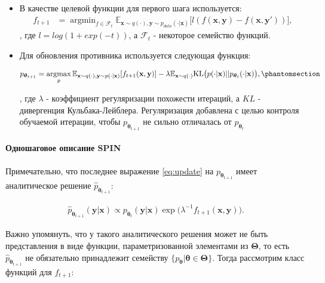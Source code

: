 \documentclass[12pt, twoside]{article}
\newcommand{\bx}{\mathbf{x}}
\newcommand{\by}{\mathbf{y}}
\newcommand{\btheta}{\boldsymbol{\theta}}
\newcommand{\bTheta}{\boldsymbol{\Theta}}
\newcommand{\cF}{\mathcal{F}}
\newcommand{\EE}{\mathbb{E}}
\newcommand{\argmax}{\mathop{\mathrm{argmax}}}
\newcommand{\argmin}{\mathop{\mathrm{argmin}}}
\begin{document}
\begin{itemize}
    \item В качестве целевой функции для первого шага используется:
    \begin{align}
        f_{t+1} &= \argmin_{f \in \cF_{t}}\EE_{\bx\sim q(\cdot), \by\sim p_{data}(\cdot | \bx)}\big[l(f(\bx, \by) - f(\bx, \by')) \big], \label{eq:f*1}
    \end{align}
    , где $l = log(1 + exp(-t))$, а $\cF_t$ - некоторое семейство функций.

    \vspace{8}

    \item Для обновления противника используется следующая функция:
    
    \begin{align} 
        p_{\btheta_{t+1}} = \argmax_ {p}\EE_{\bx \sim q(\cdot), \by\sim p(\cdot|\bx)} [f_{t+1}(\bx, \by)] - \lambda \EE_{\bx\sim q(\cdot)}\mathrm{KL}\big(p(\cdot|\bx)||p_{\btheta_t}(\cdot|\bx)\big), \phantomsection\label{eq:update}
    \end{align} 
    
    , где $\lambda$ - коэффициент регуляризации похожести итераций, а $KL$ - дивергенция Кульбака-Лейблера. Регуляризация добавлена с целью контроля обучаемой итерации, чтобы $p_\btheta_{t+1}$ не сильно отличалась от $p_\btheta_t$
    
    
\end{itemize}

\paragraph{Одношаговое описание SPIN}

Примечательно, что последнее выражение \eqref{eq:update} на $p_{\btheta_{t+1}}$ имеет аналитическое решение $\hat p_{\btheta_{t+1}}$:

\begin{align}
\hat{p}_{\btheta_{t+1}}(\by|\bx) \propto p_{\btheta_t}(\by|\bx) \exp\big(\lambda^{-1}f_{t+1}(\bx, \by)\big). \label{eq:closed form solution}  
\end{align}

Важно упомянуть, что у такого аналитического решения может не быть представления в виде функции, параметризованной элементами из $\bTheta$, то есть $\hat{p}_{\btheta_{t+1}}$ не обязательно принадлежит семейству $\{p_{\btheta} | \btheta \in \bTheta\}$. Тогда рассмотрим класс функций для $f_{t+1}$:
\end{document}
